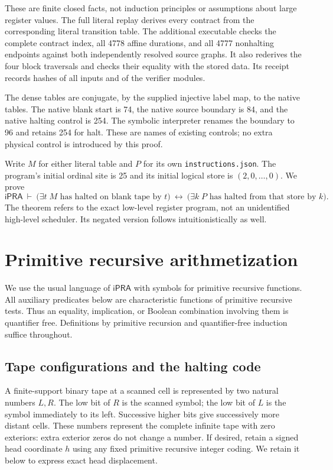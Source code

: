 \documentclass[11pt]{article}
\newcommand{\ipra}{\mathsf{iPRA}}
\begin{document}
These are finite closed facts, not induction principles or assumptions about
large register values.  The full literal replay derives every contract from
the corresponding literal transition table.  The additional executable
 checks the complete contract index, all
4778 affine durations, and all 4777 nonhalting endpoints against both
independently resolved source graphs.  It also rederives the four block
traversals and checks their equality with the stored data.  Its receipt
records hashes of all inputs and of the verifier modules.

The dense tables are conjugate, by the supplied injective label map, to
the native tables.  The native blank start is 74, the native source boundary
is 84, and the native halting control is 254.  The symbolic interpreter
renames the boundary to 96 and retains 254 for halt.  These are names of
existing controls; no extra physical control is introduced by this proof.

Write $M$ for either literal table and $P$ for its own
\texttt{instructions.json}.  The program's initial ordinal site is 25 and
its initial logical store is $(2,0,\ldots,0)$.  We prove
\[
 \ipra\ \vdash\
 \bigl(\exists t\; M\text{ has halted on blank tape by }t\bigr)
 \ \longleftrightarrow\
 \bigl(\exists k\; P\text{ has halted from that store by }k\bigr).
 \tag{1}
\]
The theorem refers to the exact low-level register program, not an
unidentified high-level scheduler.  Its negated version follows
intuitionistically as well.

\section{Primitive recursive arithmetization}

We use the usual language of $\ipra$ with symbols for primitive recursive
functions.  All auxiliary predicates below are characteristic functions of
primitive recursive tests.  Thus an equality, implication, or Boolean
combination involving them is quantifier free.  Definitions by primitive
recursion and quantifier-free induction suffice throughout.

\subsection{Tape configurations and the halting code}

A finite-support binary tape at a scanned cell is represented by two
natural numbers $L,R$.  The low bit of $R$ is the scanned symbol; the low bit
of $L$ is the symbol immediately to its left.  Successive higher bits give
successively more distant cells.  These numbers represent the complete
infinite tape with zero exteriors: extra exterior zeros do not change a
number.  If desired, retain a signed head coordinate $h$ using any fixed
primitive recursive integer coding.  We retain it below to express exact
head displacement.
\end{document}
